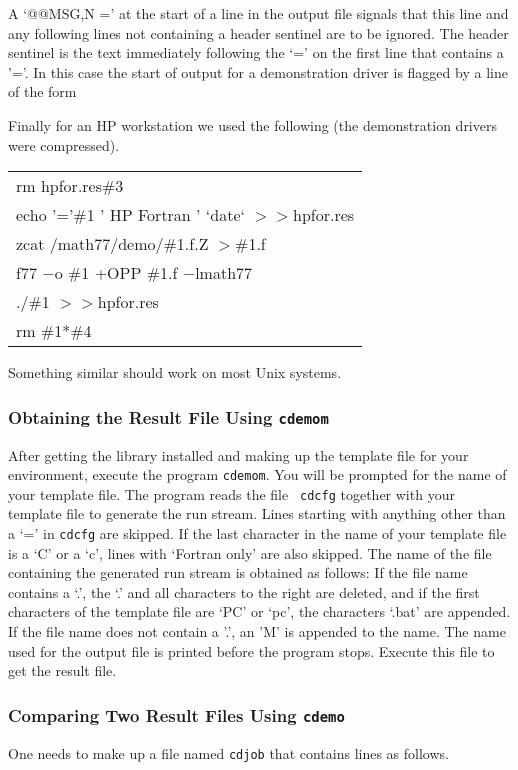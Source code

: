 \documentclass[twoside]{MATH77}
\begin{document}
A `@@MSG,N =' at the start of a line in the output file signals that
this line and any following lines not containing a header sentinel are to
be ignored.  The header sentinel is the text immediately following the
`=' on the first line that contains a '='.  In this case the start of
output for a demonstration driver is flagged by a line of the form

Finally for an HP workstation we used the following (the demonstration
drivers were compressed).

\begin{tabular}{l}
rm hpfor.res\#3\\
echo '='\#1 ' HP Fortran  ' `date` $>>$hpfor.res\\
zcat /math77/demo/\#1.f.Z $>$\#1.f\\
f77 $-$o \#1 +OPP \#1.f $-$lmath77\\
./\#1 $>>$hpfor.res\\
rm \#1*\#4
\end{tabular}

Something similar should work on most Unix systems.

\subsubsection{Obtaining the Result File Using {\tt cdemom}}
After getting the library installed and making up the template file for
your environment, execute the program {\tt cdemom}.  You will be prompted
for the name of your template file.  The program reads the file {\tt
cdcfg} together with your template file to generate the run stream.  Lines
starting with anything other than a `=' in {\tt cdcfg} are skipped.  If
the last character in the name of your template file is a `C' or a `c',
lines with `Fortran only' are also skipped.  The name of the file
containing the generated run stream is obtained as follows: If the file
name contains a `.', the `.' and all characters to the right are deleted,
and if the first characters of the template file are `PC' or `pc', the
characters `.bat' are appended.  If the file name does not contain a '.',
an 'M' is appended to the name.  The name used for the output file is
printed before the program stops.  Execute this file to get the result
file.

\subsubsection{Comparing Two Result Files Using {\tt cdemo}}
One needs to make up a file named {\tt cdjob} that contains lines as
follows.
\end{document}
